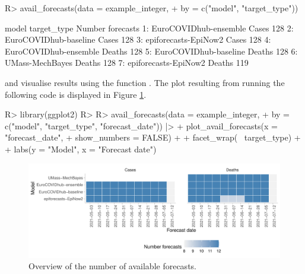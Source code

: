 \documentclass[
]{jss}
\begin{document}
\begin{CodeChunk}
\begin{CodeInput}
R> avail_forecasts(data = example_integer, 
+                 by = c("model", "target_type"))
\end{CodeInput}
\begin{CodeOutput}
                   model target_type Number forecasts
1: EuroCOVIDhub-ensemble       Cases              128
2: EuroCOVIDhub-baseline       Cases              128
3:  epiforecasts-EpiNow2       Cases              128
4: EuroCOVIDhub-ensemble      Deaths              128
5: EuroCOVIDhub-baseline      Deaths              128
6:       UMass-MechBayes      Deaths              128
7:  epiforecasts-EpiNow2      Deaths              119
\end{CodeOutput}
\end{CodeChunk}

and visualise results using the function
. The plot resulting from running the
following code is displayed in Figure \ref{fig:avail-forecasts-plot}.

\begin{CodeChunk}
\begin{CodeInput}
R> library(ggplot2)
R> 
R> avail_forecasts(data = example_integer, 
+                 by = c("model", "target_type", "forecast_date")) |>
+   plot_avail_forecasts(x = "forecast_date", 
+                        show_numbers = FALSE) + 
+   facet_wrap(~ target_type) + 
+   labs(y = "Model", x = "Forecast date") 
\end{CodeInput}
\begin{figure}[!h]

{\centering \includegraphics[width=1\linewidth]{manuscript_files/figure-latex/avail-forecasts-plot-1} 

}

\caption[Overview of the number of available forecasts]{Overview of the number of available forecasts.}\label{fig:avail-forecasts-plot}
\end{figure}
\end{CodeChunk}
\end{document}
